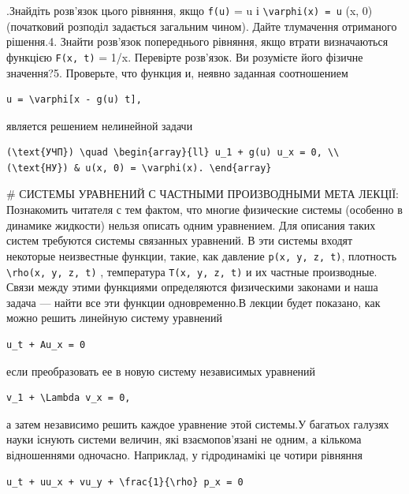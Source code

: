 \documentclass[
  ukrainian,
]{article}
\begin{document}
.Знайдіть розв'язок цього рівняння, якщо \texttt{f(u)} = u і
\texttt{\textbackslash{}varphi(x)\ =\ u} (x, 0) (початковий розподіл
задається загальним чином). Дайте тлумачення отриманого рішення.4.
Знайти розв'язок попереднього рівняння, якщо втрати визначаються
функцією \texttt{F(x,\ t)} = 1/x. Перевірте розв'язок. Ви розумієте його
фізичне значення?5. Проверьте, что функция и, неявно заданная
соотношением

\begin{verbatim}
u = \varphi[x - g(u) t],
\end{verbatim}

является решением нелинейной задачи

\begin{verbatim}
(\text{УЧП}) \quad \begin{array}{ll} u_1 + g(u) u_x = 0, \\ (\text{НУ}) & u(x, 0) = \varphi(x). \end{array}
\end{verbatim}

\# СИСТЕМЫ УРАВНЕНИЙ С ЧАСТНЫМИ ПРОИЗВОДНЫМИ МЕТА ЛЕКЦІЇ: Познакомить
читателя с тем фактом, что многие физические системы (особенно в
динамике жидкости) нельзя описать одним уравнением. Для описания таких
систем требуются системы связанных уравнений. В эти системы входят
некоторые неизвестные функции, такие, как давление
\texttt{p(x,\ y,\ z,\ t)}, плотность
\texttt{\textbackslash{}rho(x,\ y,\ z,\ t)} , температура
\texttt{T(x,\ y,\ z,\ t)} и их частные производные. Связи между этими
функциями определяются физическими законами и наша задача --- найти все
эти функции одновременно.В лекции будет показано, как можно решить
линейную систему уравнений

\begin{verbatim}
u_t + Au_x = 0
\end{verbatim}

если преобразовать ее в новую систему независимых уравнений

\begin{verbatim}
v_1 + \Lambda v_x = 0,
\end{verbatim}

а затем независимо решить каждое уравнение этой системы.У багатьох
галузях науки існують системи величин, які взаємопов'язані не одним, а
кількома відношеннями одночасно. Наприклад, у гідродинамікі це чотири
рівняння

\begin{verbatim}
u_t + uu_x + vu_y + \frac{1}{\rho} p_x = 0
\end{verbatim}
\end{document}
